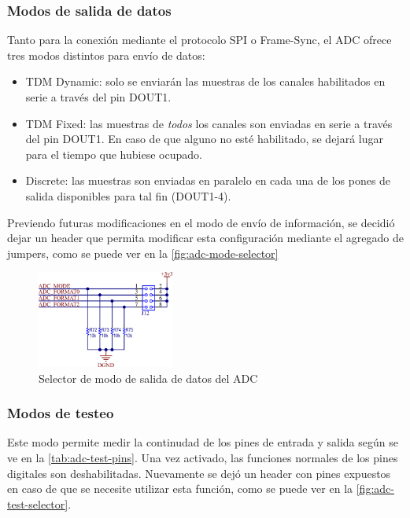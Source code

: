 \documentclass[../et.tex]{subfiles}
\begin{document}
\subsubsection{Modos de salida de datos}
Tanto para la conexión mediante el protocolo SPI o Frame-Sync, el ADC ofrece tres modos distintos para envío de datos:

\begin{itemize}
  \item TDM Dynamic: solo se enviarán las muestras de los canales habilitados en serie a través del pin DOUT1.
  \item TDM Fixed: las muestras de \emph{todos} los canales son enviadas en serie a través del pin DOUT1. En caso de que alguno no esté habilitado, se dejará lugar para el tiempo que hubiese ocupado.
  \item Discrete:  las muestras son enviadas en paralelo en cada una de los pones de salida disponibles para tal fin (DOUT1-4).
\end{itemize}

Previendo futuras modificaciones en el modo de envío de información, se decidió dejar un header que permita modificar esta configuración mediante el agregado de jumpers, como se puede ver en la \autoref{fig:adc-mode-selector}

\begin{figure}[!htbp]
  \centering
  \includegraphics[width=0.4\textwidth]{../images/adc-mode-selector.png}
  \caption{Selector de modo de salida de datos del ADC}
  \label{fig:adc-mode-selector}
\end{figure}

\subsubsection{Modos de testeo}
Este modo permite medir la continudad de los pines de entrada y salida según se ve en la \autoref{tab:adc-test-pins}. Una vez activado, las funciones normales de los pines digitales son deshabilitadas. Nuevamente se dejó un header con pines expuestos en caso de que se necesite utilizar esta función, como se puede ver en la \autoref{fig:adc-test-selector}.
\end{document}
